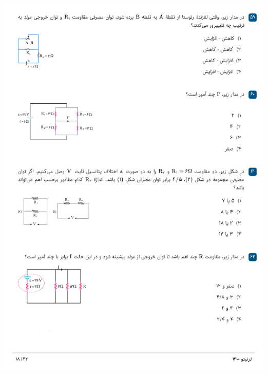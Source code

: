 \documentclass{book}
\begin{document}
\includegraphics[width=\textwidth]{"pages/18"}
\end{document}
